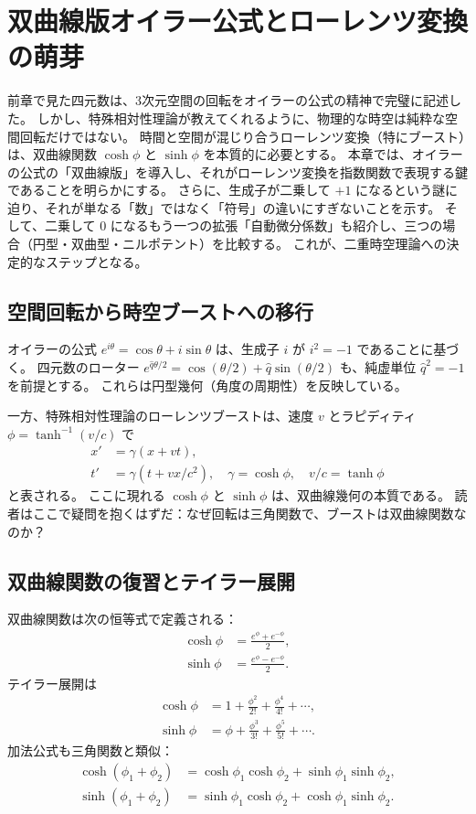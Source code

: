\documentclass[dvipdfmx,a4paper]{jsbook}
\theoremstyle{definition}
\theoremstyle{remark}
\begin{document}
\chapter{双曲線版オイラー公式とローレンツ変換の萌芽}
\label{chap:hyperbolic-euler}

前章で見た四元数は、3次元空間の回転をオイラーの公式の精神で完璧に記述した。
しかし、特殊相対性理論が教えてくれるように、物理的な時空は純粋な空間回転だけではない。
時間と空間が混じり合うローレンツ変換（特にブースト）は、双曲線関数 $\cosh\phi$ と $\sinh\phi$ を本質的に必要とする。
本章では、オイラーの公式の「双曲線版」を導入し、それがローレンツ変換を指数関数で表現する鍵であることを明らかにする。
さらに、生成子が二乗して $+1$ になるという謎に迫り、それが単なる「数」ではなく「符号」の違いにすぎないことを示す。
そして、二乗して $0$ になるもう一つの拡張「自動微分係数」も紹介し、三つの場合（円型・双曲型・ニルポテント）を比較する。
これが、二重時空理論への決定的なステップとなる。

\section{空間回転から時空ブーストへの移行}
\label{sec:rotation-to-boost}

オイラーの公式 $e^{i\theta} = \cos\theta + i\sin\theta$ は、生成子 $i$ が $i^2 = -1$ であることに基づく。
四元数のローター $e^{\hat{q}\theta/2} = \cos(\theta/2) + \hat{q}\sin(\theta/2)$ も、純虚単位 $\hat{q}^2 = -1$ を前提とする。
これらは円型幾何（角度の周期性）を反映している。

一方、特殊相対性理論のローレンツブーストは、速度 $v$ とラピディティ $\phi = \tanh^{-1}(v/c)$ で
\begin{align}
  x' &= \gamma (x + v t), \\
  t' &= \gamma (t + v x / c^2), \quad \gamma = \cosh\phi, \quad v/c = \tanh\phi
\end{align}
と表される。
ここに現れる $\cosh\phi$ と $\sinh\phi$ は、双曲線幾何の本質である。
読者はここで疑問を抱くはずだ：なぜ回転は三角関数で、ブーストは双曲線関数なのか？

\section{双曲線関数の復習とテイラー展開}
\label{sec:hyperbolic-review}

双曲線関数は次の恒等式で定義される：
\begin{align}
  \cosh\phi &= \frac{e^\phi + e^{-\phi}}{2}, \\
  \sinh\phi &= \frac{e^\phi - e^{-\phi}}{2}.
\end{align}
テイラー展開は
\begin{align}
  \cosh\phi &= 1 + \frac{\phi^2}{2!} + \frac{\phi^4}{4!} + \cdots, \\
  \sinh\phi &= \phi + \frac{\phi^3}{3!} + \frac{\phi^5}{5!} + \cdots.
\end{align}
加法公式も三角関数と類似：
\begin{align}
  \cosh(\phi_1 + \phi_2) &= \cosh\phi_1 \cosh\phi_2 + \sinh\phi_1 \sinh\phi_2, \\
  \sinh(\phi_1 + \phi_2) &= \sinh\phi_1 \cosh\phi_2 + \cosh\phi_1 \sinh\phi_2.
\end{align}
\end{document}
